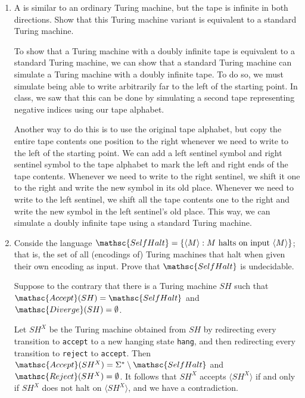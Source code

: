 \documentclass[11pt]{article}
\def\Sym#1{\texttt{\color{BrickRed}#1}}
\begin{document}
\begin{enumerate}\parindent 1.5em

\item A  is similar to an ordinary
Turing machine, but the tape is infinite in both directions. Show that this Turing
machine variant is equivalent to a standard Turing machine.

\begin{Solution}
To show that a Turing machine with a doubly infinite tape is equivalent
to a standard Turing machine, we can show that a standard Turing
machine can simulate a Turing machine with a doubly infinite tape.
To do so, we must simulate being able to write arbitrarily far to the left of the starting
point. In class, we saw that this can be done by simulating a second tape representing
negative indices using our tape alphabet.

Another way to do this is to use the original tape alphabet, but copy the entire
tape contents one position to the right whenever we need to write to the left of
the starting point. We can add a left sentinel symbol and right sentinel symbol to the
tape alphabet to mark the left and right ends of the tape contents. Whenever we need
to write to the right sentinel, we shift it one to the right and write the new symbol
in its old place. Whenever we need to write to the left sentinel, we shift all the tape contents one
to the right and write the new symbol in the left sentinel's old place. This way, we can simulate a doubly infinite tape using a standard Turing machine.
\end{Solution}

\item Conside the language $\mathsc{SelfHalt} = \{ \langle M \rangle : M \text{
halts on input } \langle M \rangle \}$; that is, the set of all (encodings of)
Turing machines that halt when given their own encoding as input. Prove that
$\mathsc{SelfHalt}$ is undecidable.

\begin{Solution}
Suppose to the contrary that there is a Turing machine $SH$ such that
$\mathsc{Accept}(SH) = \mathsc{SelfHalt}$ and $\mathsc{Diverge}(SH) =
\emptyset$.

Let $SH^X$ be the Turing machine
obtained from $SH$ by redirecting every transition to \Sym{accept} to a new hanging
state \Sym{hang}, and then redirecting every transition to \Sym{reject} to
\Sym{accept}. Then $\mathsc{Accept}(SH^X) = \Sigma^* \setminus \mathsc{SelfHalt}$ and
$\mathsc{Reject}(SH^X) = \emptyset$.  It follows that $SH^X$ accepts $\langle SH^X
\rangle$ if and only if $SH^X$ does not halt on $\langle SH^X \rangle$, and
we have a contradiction.
\end{Solution}


\end{enumerate}
\end{document}
